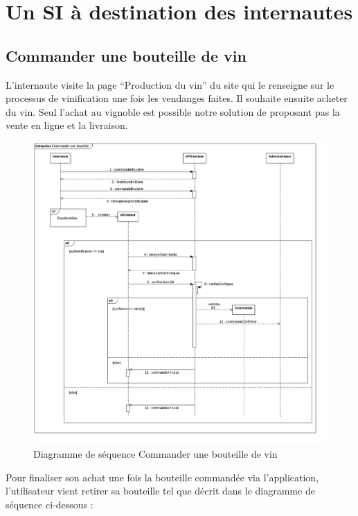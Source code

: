 \documentclass[a4paper, title]{report}
\begin{document}
\section{Un SI à destination des internautes}\label{un-si-a-destination-des-internautes}

\subsection{Commander une bouteille de vin}\label{commander-une-bouteille-de-vin}

L'internaute visite la page ``Production du vin'' du site qui le
renseigne sur le processus de vinification une fois les vendanges
faites. Il souhaite ensuite acheter du vin. Seul l'achat au vignoble est
possible notre solution de proposant pas la vente en ligne et la
livraison.

\begin{figure}
\centering
\includegraphics{Images/SequenceDiagramCommanderBouteille.jpg}
\caption{Diagramme de séquence Commander une bouteille de vin}
\end{figure}

Pour finaliser son achat une fois la bouteille commandée via
l'application, l'utilisateur vient retirer sa bouteille tel que décrit
dans le diagramme de séquence ci-dessous :
\end{document}
